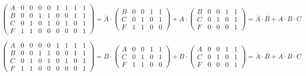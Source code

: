 \documentclass[a4paper,10pt]{article} %
\begin{document}
	\begin{equation}
		\left(
		\begin{smallmatrix}
			A & 0 & 0 & 0 & 0 & 1 & 1 & 1 & 1 \\
			B & 0 & 0 & 1 & 1 & 0 & 0 & 1 & 1 \\
			C & 0 & 1 & 0 & 1 & 0 & 1 & 0 & 1 \\
			F & 1 & 1 & 0 & 0 & 0 & 0 & 0 & 1
		\end{smallmatrix}
		\right)
		= 
		\overline{A} \cdot 
		\left(
		\begin{smallmatrix}
			B & 0 & 0 & 1 & 1 \\
			C & 0 & 1 & 0 & 1 \\
			F & 1 & 1 & 0 & 0
		\end{smallmatrix} 
		\right)
		+ 
		A \cdot
		\left(
		\begin{smallmatrix}
			B & 0 & 0 & 1 & 1 \\
			C & 0 & 1 & 0 & 1 \\
			F & 0 & 0 & 0 & 1
		\end{smallmatrix}
		\right)
		= \overline{A} \cdot \overline{B} + A \cdot B \cdot C
	\end{equation}
	
	\begin{equation}
		\left(
		\begin{smallmatrix}
			A & 0 & 0 & 0 & 0 & 1 & 1 & 1 & 1 \\
			B & 0 & 0 & 1 & 1 & 0 & 0 & 1 & 1 \\
			C & 0 & 1 & 0 & 1 & 0 & 1 & 0 & 1 \\
			F & 1 & 1 & 0 & 0 & 0 & 0 & 0 & 1
		\end{smallmatrix}
		\right)
		= \overline{B} \cdot
		\left(
		\begin{smallmatrix}
			A & 0 & 0 & 1 & 1 \\
			C & 0 & 1 & 0 & 1 \\
			F & 1 & 1 & 0 & 0 
		\end{smallmatrix}
		\right)
		+ B \cdot
		\left(
		\begin{smallmatrix}
			A & 0 & 0 & 1 & 1 \\
			C & 0 & 1 & 0 & 1 \\
			F & 0 & 0 & 0 & 1
		\end{smallmatrix}
		\right)
		= \overline{A} \cdot \overline{B} + A \cdot B \cdot C
	\end{equation}
\end{document}

